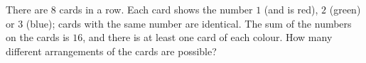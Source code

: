 There are $8$ cards in a row. Each card shows the number $1$ (and is red), $2$ (green) or $3$ (blue); cards with the same number are identical. The sum of the numbers on the cards is $16$, and there is at least one card of each colour. How many different arrangements of the cards are possible?
